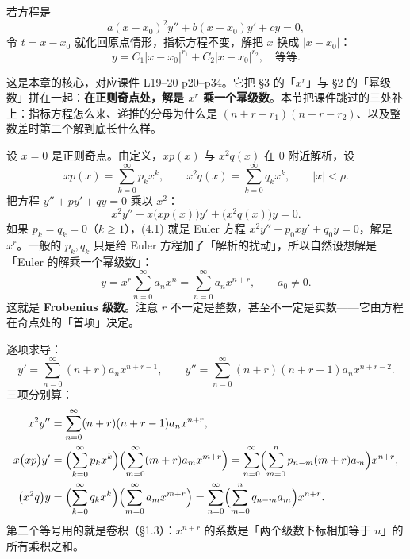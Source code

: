\documentclass[11pt]{ctexart}
\let\orighdr\hdr
\renewcommand{\hdr}[2]{\needspace{6\baselineskip}\orighdr{#1}{#2}}
\let\origsubhdr\subhdr
\renewcommand{\subhdr}[1]{\needspace{3\baselineskip}\origsubhdr{#1}}
\begin{document}

若方程是
\[
a(x-x_0)^2y''+b(x-x_0)y'+cy=0,
\]
令 $t=x-x_0$ 就化回原点情形，指标方程不变，解把 $x$ 换成 $|x-x_0|$：
\[
y=C_1|x-x_0|^{r_1}+C_2|x-x_0|^{r_2},\quad\text{等等}.
\]



这是本章的核心，对应课件 L19--20 p20--p34。它把 §3 的「$x^r$」与 §2 的「幂级数」拼在一起：\textbf{在正则奇点处，解是 $x^r$ 乘一个幂级数}。本节把课件跳过的三处补上：指标方程怎么来、递推的分母为什么是 $(n+r-r_1)(n+r-r_2)$、以及整数差时第二个解到底长什么样。


设 $x=0$ 是正则奇点。由定义，$xp(x)$ 与 $x^2q(x)$ 在 $0$ 附近解析，设
\[
xp(x)=\sum_{k=0}^{\infty}p_kx^k,\qquad x^2q(x)=\sum_{k=0}^{\infty}q_kx^k,\qquad |x|<\rho .
\]
把方程 $y''+py'+qy=0$ 乘以 $x^2$：
\[
x^2y''+x\bigl(xp(x)\bigr)y'+\bigl(x^2q(x)\bigr)y=0 . \tag{4.1}
\]
如果 $p_k=q_k=0$（$k\geq1$），(4.1) 就是 Euler 方程 $x^2y''+p_0xy'+q_0y=0$，解是 $x^r$。一般的 $p_k,q_k$ 只是给 Euler 方程加了「解析的扰动」，所以自然设想解是「Euler 的解乘一个幂级数」：
\[
y=x^r\sum_{n=0}^{\infty}a_nx^n=\sum_{n=0}^{\infty}a_nx^{n+r},\qquad a_0\neq0 .
\]
这就是 \textbf{Frobenius 级数}。注意 $r$ 不一定是整数，甚至不一定是实数——它由方程在奇点处的「首项」决定。


逐项求导：
\[
y'=\sum_{n=0}^{\infty}(n+r)a_nx^{n+r-1},\qquad
y''=\sum_{n=0}^{\infty}(n+r)(n+r-1)a_nx^{n+r-2}.
\]
三项分别算：
\begin{align*}
x^2y''&=\sum_{n=0}^{\infty}(n+r)(n+r-1)a_nx^{n+r},\\
x\bigl(xp\bigr)y'&=\Bigl(\sum_{k=0}^{\infty}p_kx^k\Bigr)\Bigl(\sum_{m=0}^{\infty}(m+r)a_mx^{m+r}\Bigr)
=\sum_{n=0}^{\infty}\Bigl(\sum_{m=0}^{n}p_{n-m}(m+r)a_m\Bigr)x^{n+r},\\
\bigl(x^2q\bigr)y&=\Bigl(\sum_{k=0}^{\infty}q_kx^k\Bigr)\Bigl(\sum_{m=0}^{\infty}a_mx^{m+r}\Bigr)
=\sum_{n=0}^{\infty}\Bigl(\sum_{m=0}^{n}q_{n-m}a_m\Bigr)x^{n+r}.
\end{align*}
第二个等号用的就是卷积（§1.3）：$x^{n+r}$ 的系数是「两个级数下标相加等于 $n$」的所有乘积之和。
\end{document}
